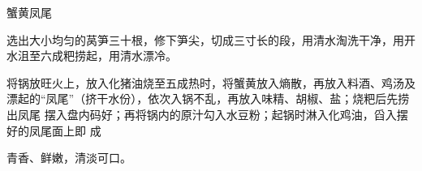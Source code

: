 \begin{recipe}{蟹黄凤尾}

\ingredients


\preparation

\step 选出大小均匀的莴笋三十根，修下笋尖，切成三寸长的段，用清水淘洗干净，用开
水沮至六成粑捞起，用清水漂冷。

\step 将锅放旺火上，放入化猪油烧至五成热时，将蟹黄放入熵散，再放入料酒、鸡汤及
漂起的“凤尾”（挤干水份），依次入锅不乱，再放入味精、胡椒、盐；烧粑后先捞出凤尾
摆入盘内码好；再将锅内的原汁勾入水豆粉；起锅时淋入化鸡油，舀入摆好的凤尾面上即
成

\features

青香、鲜嫩，清淡可口。

\end{recipe}

